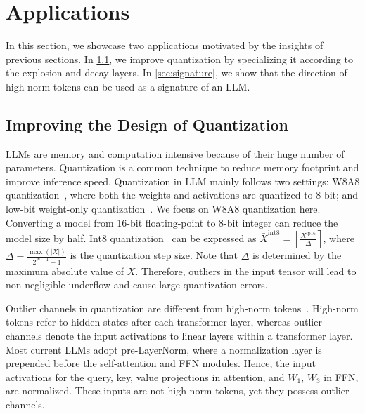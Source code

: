\section{Applications}\label{sec:exp}

In this section, we showcase two applications motivated by the insights of previous sections.
In \cref{sec:quantization}, we improve quantization by specializing it according to the explosion and decay layers.
In \cref{sec:signature}, we show that the direction of high-norm tokens can be used as a signature of an LLM\@.

\subsection{Improving the Design of Quantization}\label{sec:quantization}

LLMs are memory and computation intensive because of their huge number of parameters.
Quantization is a common technique to reduce memory footprint and improve inference speed.
Quantization in LLM mainly follows two settings: W8A8 quantization~\cite{dettmers2022gpt3,xiao2023smoothquant}, where both the weights and activations are quantized to 8-bit; and low-bit weight-only quantization~\cite{lin2024awq,frantar2022gptq}.
We focus on W8A8 quantization here.
Converting a model from 16-bit floating-point to 8-bit integer can reduce the model size by half.
Int8 quantization~\cite{jacob2018quantization} can be expressed as \(\bar X^{\textrm{int8}}=\left\lfloor \frac{X^{\textrm{fp16}}}{\Delta} \right\rceil\), where \(\Delta=\frac{\max(|X|)}{2^{N-1}-1}\) is the quantization step size.
Note that \(\Delta\) is determined by the maximum absolute value of \(X\).
Therefore, outliers in the input tensor will lead to non-negligible underflow and cause large quantization errors.

Outlier channels in quantization are different from high-norm tokens~\cite{sun2024massive}.
High-norm tokens refer to hidden states after each transformer layer, whereas outlier channels denote the input activations to linear layers within a transformer layer.
Most current LLMs adopt pre-LayerNorm, where a normalization layer is prepended before the self-attention and FFN modules.
Hence, the input activations for the query, key, value projections in attention, and \(W_1\), \(W_3\) in FFN, are normalized.
These inputs are not high-norm tokens, yet they possess outlier channels.

